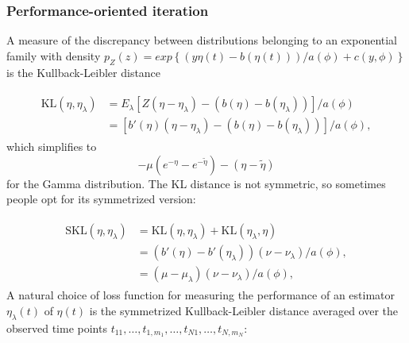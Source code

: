 \subsubsection{Performance-oriented iteration} 

A measure of the discrepancy between distributions belonging to an exponential family with density $p_Z\left(z\right) = exp\left\{\left(y \eta\left(t\right) - b\left(\eta\left(t\right)\right)\right)/a\left(\phi\right) + c\left(y,\phi\right) \right\}$ is the Kullback-Leibler distance

\begin{align}
\begin{split} \label{eq:kl-distance-definition}
\mbox{KL}\left(\eta, \eta_\lambda\right) &= E_\lambda\left[Z \left(\eta - \eta_\lambda \right) - \left(b\left(\eta\right)- b\left(\eta_\lambda\right) \right)\right]/a\left(\phi\right)\\
&=\left[ b'\left(\eta\right) \left(\eta - \eta_\lambda \right) - \left(b\left(\eta\right)- b\left(\eta_\lambda\right) \right)\right]/a\left(\phi\right),
\end{split}
\end{align}
\noindent
which simplifies to
\[
-\mu\left( e^{-\eta} - e^{-\tilde{\eta}}\right) - \left(\eta-\tilde{\eta}\right)
\]
\noindent
for the Gamma distribution. The KL distance is not symmetric, so sometimes people opt for its symmetrized version:

\begin{align}
\begin{split} \label{eq:skl-distance-definition}
\mbox{SKL}\left(\eta, \eta_\lambda\right) &= \mbox{KL}\left(\eta, \eta_\lambda\right) + \mbox{KL}\left(\eta_\lambda, \eta \right)\\
&= \left(b'\left(\eta\right) - b'\left(\eta_\lambda\right) \right)\left( \nu - \nu_\lambda\right)/a\left(\phi\right), \\
&= \left(\mu - \mu_\lambda \right)\left( \nu - \nu_\lambda\right)/a\left(\phi\right),
\end{split}
\end{align}
\noindent
A natural choice of loss function for measuring the performance of an estimator $\eta_\lambda\left(t\right)$ of $\eta \left(t\right)$ is the symmetrized Kullback-Leibler distance averaged over the observed time points $t_{11}, \dots , t_{1,m_1},\dots,t_{N1}, \dots , t_{N,m_N}$:


